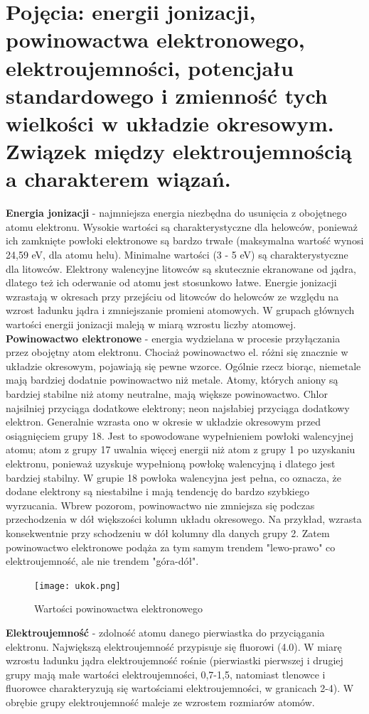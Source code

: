 \documentclass{article}
\begin{document}
\section{Pojęcia: energii jonizacji, powinowactwa elektronowego, elektroujemności, potencjału standardowego i zmienność tych wielkości w układzie okresowym. Związek między elektroujemnością a charakterem wiązań.}

\textbf{Energia jonizacji} - najmniejsza energia niezbędna do usunięcia z obojętnego atomu elektronu. Wysokie wartości są charakterystyczne dla helowców, ponieważ ich zamknięte powłoki elektronowe są bardzo trwałe (maksymalna wartość wynosi 24,59 eV, dla atomu helu). Minimalne wartości (3 - 5 eV) są charakterystyczne dla litowców. Elektrony walencyjne litowców są skutecznie ekranowane od jądra, dlatego też ich oderwanie od atomu jest stosunkowo łatwe. Energie jonizacji wzrastają w okresach przy przejściu od litowców do helowców ze względu na wzrost ładunku jądra i zmniejszanie promieni atomowych. W grupach głównych wartości energii jonizacji maleją w miarą wzrostu liczby atomowej.\\
\textbf{Powinowactwo elektronowe} - energia wydzielana w procesie przyłączania przez obojętny atom elektronu. Chociaż powinowactwo el. różni się znacznie w układzie okresowym, pojawiają się pewne wzorce. Ogólnie rzecz biorąc, niemetale mają bardziej dodatnie powinowactwo niż metale. Atomy, których aniony są bardziej stabilne niż atomy neutralne, mają większe powinowactwo. Chlor najsilniej przyciąga dodatkowe elektrony; neon najsłabiej przyciąga dodatkowy elektron. Generalnie wzrasta ono w okresie w układzie okresowym przed osiągnięciem grupy 18. Jest to spowodowane wypełnieniem powłoki walencyjnej atomu; atom z grupy 17 uwalnia więcej energii niż atom z grupy 1 po uzyskaniu elektronu, ponieważ uzyskuje wypełnioną powłokę walencyjną i dlatego jest bardziej stabilny. W grupie 18 powłoka walencyjna jest pełna, co oznacza, że dodane elektrony są niestabilne i mają tendencję do bardzo szybkiego wyrzucania. Wbrew pozorom, powinowactwo nie zmniejsza się podczas przechodzenia w dół większości kolumn układu okresowego. Na przykład, wzrasta konsekwentnie przy schodzeniu w dół kolumny dla danych grupy 2. Zatem powinowactwo elektronowe podąża za tym samym trendem "lewo-prawo" co elektroujemność, ale nie trendem "góra-dół".
\begin{figure}[H]
    \centering
    \texttt{[image: ukok.png]}
    \caption{Wartości powinowactwa elektronowego}
    \label{fig:ukok}
\end{figure}
\textbf{Elektroujemność} - zdolność atomu danego pierwiastka do przyciągania elektronu. Największą elektroujemność przypisuje się fluorowi (4.0). W miarę wzrostu ładunku jądra elektroujemność rośnie (pierwiastki pierwszej i drugiej grupy mają małe wartości elektroujemności, 0,7-1,5, natomiast tlenowce i fluorowce charakteryzują się wartościami elektroujemności, w granicach 2-4). W obrębie grupy elektroujemność maleje ze wzrostem rozmiarów atomów.\\
\end{document}
